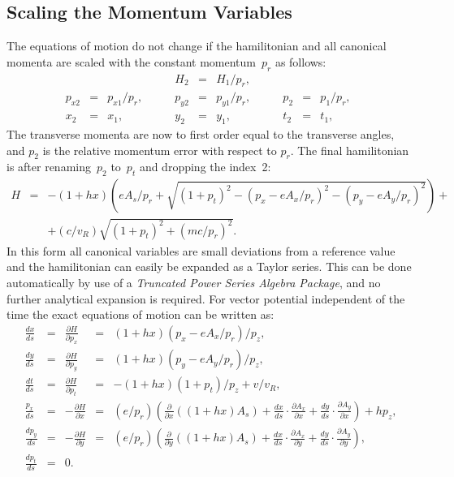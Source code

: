 \documentclass{report}
\begin{document}
\clearpage
\subsection{Scaling the Momentum Variables}
The equations of motion do not change if the hamilitonian and all 
canonical momenta are scaled with the constant momentum~$p_r$
as follows:
\begin{equation}
  \begin{array}{lcllcllcl}
    &&&H_2&=&H_1/p_r, \\
    p_{x2}&=&p_{x1}/p_r, \qquad &
    p_{y2}&=&p_{y1}/p_r, \qquad &
    p_2   &=&p_1/p_r, \\
    x_2&=&x_1, \qquad &
    y_2&=&y_1, \qquad &
    t_2&=&t_1, \qquad
  \end{array}
\end{equation}
The transverse momenta are now to first order equal to
the transverse angles,
and $p_2$ is the relative momentum error with respect to $p_r$.
The final hamilitonian is after renaming~$p_2$ to~$p_t$ and dropping
the index~2: 
\begin{equation}
  \begin{array}{lcl}
    H&=&- (1+h x)
    \left(
      e A_s / p_r +
      \sqrt{(1+p_t)^2-(p_x-e A_x/p_r)^2-(p_y-e A_y/p_r)^2}
    \right)+\\
    &&+(c/v_R) \sqrt{(1+p_t)^2+(mc/p_r)^2}.
  \end{array}
\end{equation}
In this form all canonical variables are small deviations from a
reference value and the hamilitonian can easily be expanded as a Taylor
series.
This can be done automatically by use of a 
\textit{Truncated Power Series Algebra Package},
and no further analytical expansion is required.
For vector potential independent of the time the exact equations of
motion can be written as: 
\begin{equation}
  \begin{array}{lcrcl}
    \frac{dx}{ds}&=&\frac{\partial H}{\partial p_x}&=&
    (1+hx)(p_x-e A_x/p_r) / p_z, \\
    \frac{dy}{ds}&=&\frac{\partial H}{\partial p_y}&=&
    (1+hx)(p_y-e A_y/p_r) / p_z, \\
    \frac{dt}{ds}&=&\frac{\partial H}{\partial p_t}&=&
    -(1+hx)(1+p_t) / p_z + v / v_R, \\ 
    \frac{p_x}{ds}&=&-\frac{\partial H}{\partial x}&=&(e/p_r)\left(
      \frac{\partial}{\partial x}((1+hx)A_s) +
      \frac{dx}{ds}\cdot\frac{\partial A_x}{\partial x} +
      \frac{dy}{ds}\cdot\frac{\partial A_y}{\partial x}
    \right) + h p_z, \\
    \frac{dp_y}{ds}&=&-\frac{\partial H}{\partial y}&=&(e/p_r)\left(
      \frac{\partial}{\partial y}((1+hx)A_s) +
      \frac{dx}{ds}\cdot\frac{\partial A_x}{\partial y} +
      \frac{dy}{ds}\cdot\frac{\partial A_y}{\partial y}\right), \\
    \frac{dp_t}{ds}&=&0.
  \end{array}
\end{equation}
\end{document}
